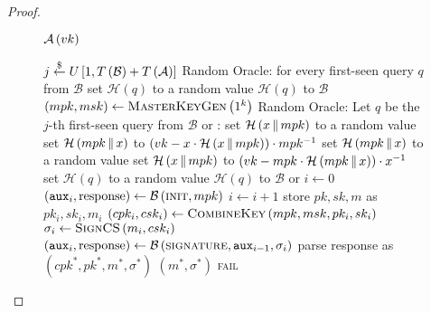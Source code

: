 \begin{proof}
    \begin{figure}[!htbp]
      \begin{algobox}{$\mathcal{A}\left(vk\right)$}
        \begin{algorithmic}[1]
          \State $j \overset{\$}{\gets} U\left[1, T\left(\mathcal{B}\right) +
          T\left(\mathcal{A}\right)\right]$
          \Indent
            \State Random Oracle: for every first-seen query $q$ from
            $\mathcal{B}$ set $\mathcal{H}\left(q\right)$ to a random value
            \State \Return $\mathcal{H}\left(q\right)$ to $\mathcal{B}$
          \EndIndent
          \State $\left(mpk, msk\right) \gets
          \textsc{MasterKeyGen}\left(1^k\right)$
          \Indent
            \State Random Oracle: Let $q$ be the $j$-th first-seen query from
            $\mathcal{B}$ or \adversary:
                \State set $\mathcal{H}\left(x \,\|\, mpk\right)$ to a random
                value
              \EndIf
              \State set $\mathcal{H}\left(mpk \,\|\, x\right)$ to $\left(vk
              - x \cdot \mathcal{H}\left(x \,\|\, mpk\right)\right) \cdot
              mpk^{-1}$
                \State set $\mathcal{H}\left(mpk \,\|\, x\right)$ to a random
                value
              \EndIf
              \State set $\mathcal{H}\left(x \,\|\, mpk\right)$ to $\left(vk
              - mpk \cdot \mathcal{H}\left(mpk \,\|\, x\right)\right) \cdot
              x^{-1}$
            \Else
              \State set $\mathcal{H}\left(q\right)$ to a random value
            \EndIf
            \State \Return $\mathcal{H}\left(q\right)$ to $\mathcal{B}$ or
            \adversary
          \EndIndent
          \State $i \gets 0$
          \State $\left(\mathtt{aux}_i, \mathrm{response}\right) \gets
          \mathcal{B}\left(\textsc{init}, mpk\right)$
            \State $i \gets i + 1$
            \State store $pk, sk, m$ as $pk_i, sk_i, m_i$
            \State $\left(cpk_i, csk_i\right) \gets
            \textsc{CombineKey}\left(mpk, msk, pk_i, sk_i\right)$
            \State $\sigma_i \gets \textsc{SignCS}\left(m_i, csk_i\right)$
            \State $\left(\mathtt{aux}_i, \mathrm{response}\right) \gets
            \mathcal{B}\left(\textsc{signature}, \mathtt{aux}_{i-1},
            \sigma_i\right)$
          \EndWhile
          \State parse response as $\left(cpk^*, pk^*, m^*, \sigma^*\right)$
           
          \label{proof:comb:master:distinguisher:won}
            \State \Return $\left(m^*, \sigma^*\right)$
          \Else
            \State \Return \textsc{fail}
          \EndIf
        \end{algorithmic}
      \end{algobox}
      \caption{}
      \label{proof:comb:master:distinguisher}
    \end{figure}


\end{proof}
